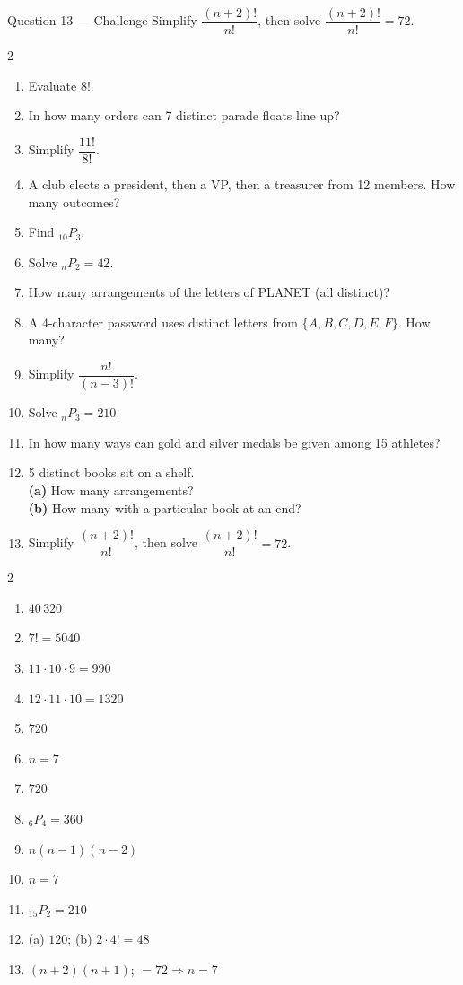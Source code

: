 \documentclass[11pt]{article}
\begin{document}
\begin{qbox}{Question 13 --- Challenge}
Simplify $\dfrac{(n+2)!}{n!}$, then solve $\dfrac{(n+2)!}{n!}=72$.\workspace{3cm}
\end{qbox}

\clearpage
{}

\begin{recapbox}
\begin{multicols}{2}
\small
\begin{enumerate}[leftmargin=*,itemsep=3pt]
  \item Evaluate $8!$.
  \item In how many orders can 7 distinct parade floats line up?
  \item Simplify $\dfrac{11!}{8!}$.
  \item A club elects a president, then a VP, then a treasurer from 12 members. How many outcomes?
  \item Find $_{10}P_3$.
  \item Solve $_nP_2=42$.
  \item How many arrangements of the letters of PLANET (all distinct)?
  \item A 4-character password uses distinct letters from $\{A,B,C,D,E,F\}$. How many?
  \item Simplify $\dfrac{n!}{(n-3)!}$.
  \item Solve $_nP_3=210$.
  \item In how many ways can gold and silver medals be given among 15 athletes?
  \item 5 distinct books sit on a shelf. \\ \textbf{(a)} How many arrangements? \\ \textbf{(b)} How many with a particular book at an end?
  \item Simplify $\dfrac{(n+2)!}{n!}$, then solve $\dfrac{(n+2)!}{n!}=72$.
\end{enumerate}
\end{multicols}
\end{recapbox}

\begin{keybox}
\begin{multicols}{2}
\small
\begin{enumerate}[leftmargin=*,itemsep=3pt]
  \item $40\,320$
  \item $7!=5040$
  \item $11\cdot10\cdot9=990$
  \item $12\cdot11\cdot10=1320$
  \item $720$
  \item $n=7$
  \item $720$
  \item $_6P_4=360$
  \item $n(n-1)(n-2)$
  \item $n=7$
  \item $_{15}P_2=210$
  \item (a) $120$; (b) $2\cdot4!=48$
  \item $(n+2)(n+1)$; $=72\Rightarrow n=7$
\end{enumerate}
\end{multicols}
\end{keybox}
\end{document}
